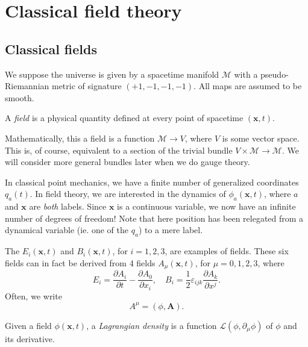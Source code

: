 \documentclass[a4paper]{article}
\begin{document}
\section{Classical field theory}
\subsection{Classical fields}
\begin{own}
  We suppose the universe is given by a spacetime manifold $\mathcal{M}$ with a pseudo-Riemannian metric of signature $(+1, -1, -1 ,-1)$. All maps are assumed to be smooth.
\end{own}

\begin{defi}[Field]
  A \emph{field} is a physical quantity defined at every point of spacetime $(\mathbf{x}, t)$.
\end{defi}

\begin{own}
  Mathematically, this a field is a function $\mathcal{M} \to V$, where $V$ is some vector space. This is, of course, equivalent to a section of the trivial bundle $V \times \mathcal{M} \to \mathcal{M}$. We will consider more general bundles later when we do gauge theory.
\end{own}

In classical point mechanics, we have a finite number of generalized coordinates $q_a(t)$. In field theory, we are interested in the dynamics of $\phi_a(\mathbf{x}, t)$, where $a$ and $\mathbf{x}$ are \emph{both} labels. Since $\mathbf{x}$ is a continuous variable, we now have an infinite number of degrees of freedom! Note that here position has been relegated from a dynamical variable (ie. one of the $q_a$) to a mere label.

\begin{eg}
  The  $E_i(\mathbf{x}, t)$ and  $B_i(\mathbf{x}, t)$, for $i = 1, 2, 3$, are examples of fields. These six fields can in fact be derived from 4 fields $A_\mu(\mathbf{x}, t)$, for $\mu = 0, 1, 2, 3$, where
  \[
    E_i = \frac{\partial A_i}{\partial t} - \frac{\partial A_0}{\partial x_i},\quad B_i = \frac{1}{2} \varepsilon_{ijk}\frac{\partial A_k}{\partial x^j}.
  \]
  Often, we write
  \[
    A^\mu = (\phi, \mathbf{A}).
  \]
\end{eg}

\begin{defi}
  Given a field $\phi (\mathbf{x}, t)$, a \emph{Lagrangian density} is a function $\mathcal{L}(\phi, \partial_\mu \phi)$ of $\phi$ and its derivative.
\end{defi}
\end{document}
